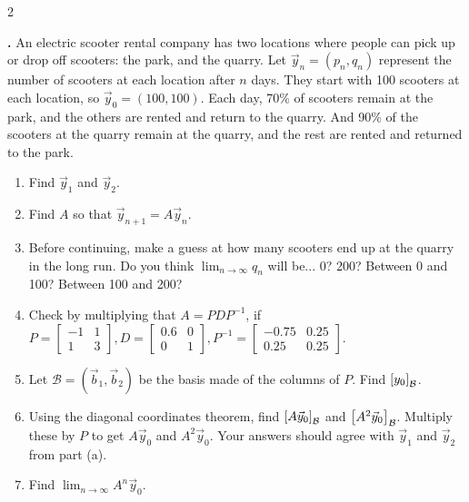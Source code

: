 \documentclass[11pt, letterpaper]{report}
\let\originalleft\left
\let\originalright\right
\renewcommand{\left}{\mathopen{}\mathclose\bgroup\originalleft}
\renewcommand{\right}{\aftergroup\egroup\originalright}
\newcounter{exercise}[section]
\newcommand{\exatend}{\refstepcounter{exercise}\par%
\noindent\textbf{\theexercise.} }
\newcounter{theorem}[chapter]
\begin{document}
\begin{multicols*}{2}
\exatend \label{exercise:4.1-24} An electric scooter rental company has two locations where people can pick up or drop off scooters: the park, and the quarry. Let $\vec{y}_n = (p_n,q_n)$ represent the number of scooters at each location after $n$ days. They start with 100 scooters at each location, so $\vec{y}_0=(100,100)$. Each day, 70\% of scooters remain at the park, and the others are rented and return to the quarry. And 90\% of the scooters at the quarry remain at the quarry, and the rest are rented and returned to the park.
\begin{enumerate}[label=(\alph*)]
\item Find $\vec{y}_1$ and $\vec{y}_2$.
\item Find $A$ so that $\vec{y}_{n+1}= A\vec{y}_n$.
\item Before continuing, make a guess at how many scooters end up at the quarry in the long run. Do you think $\lim_{n \to \infty}q_n$ will be... 0? 200? Between 0 and 100? Between 100 and 200? 
\item Check by multiplying that $A=PDP^{-1}$, if $P = \begin{bmatrix}
-1 & 1 \\
1 & 3
\end{bmatrix}, D = \begin{bmatrix}
0.6 & 0 \\
0 & 1
\end{bmatrix}, P^{-1}= \begin{bmatrix}
-0.75 & 0.25 \\
0.25 & 0.25
\end{bmatrix}$.
\item Let $\mathcal{B} = (\vec{b}_1,\vec{b}_2 )$ be the basis made of the columns of $P$. Find $\left[ y_0 \right]_{\mathcal{B}}$.
\item Using the diagonal coordinates theorem, find $\left[ A\vec{y}_{0} \right]_{\mathcal{B}}$ and $\left[ A^2\vec{y}_{0} \right]_{\mathcal{B}}$. Multiply these by $P$ to get $A\vec{y}_0$ and $A^2\vec{y}_0$. Your answers should agree with $\vec{y}_1$ and $\vec{y}_2$ from part (a).
\item Find $\lim_{n \to \infty} A^n\vec{y}_0$.
\end{enumerate}


\end{multicols*}
\end{document}
